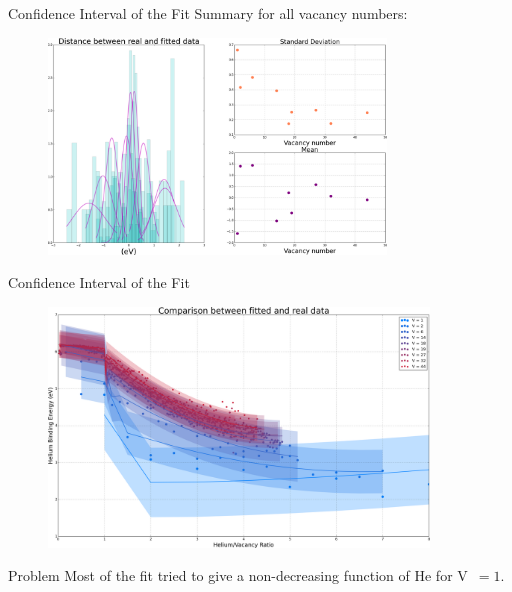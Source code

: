 \documentclass[10pt]{beamer}
\begin{document}
\begin{frame}{Confidence Interval of the Fit}
	Summary for all vacancy numbers:
	\begin{figure}
        \includegraphics[width=0.8\textwidth]{CIFit1D_23331}
    \end{figure}
\end{frame}

\begin{frame}{Confidence Interval of the Fit}
	\begin{figure}
        \includegraphics[width=0.9\textwidth]{CIComparison}
    \end{figure}
\end{frame}

\begin{frame}{Problem}
	\Large
	Most of the fit tried to give a non-decreasing function of He for V~$= 1$.
\end{frame}
\end{document}
